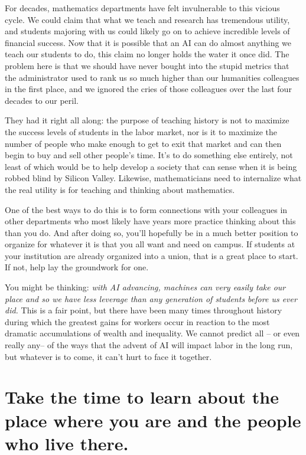 \documentclass[11pt,reqno]{amsart}
\theoremstyle{plain}
\theoremstyle{definition}
\numberwithin{equation}{section}
\numberwithin{theorem}{section}
\begin{document}
For decades, mathematics departments have felt invulnerable to this vicious cycle. We could claim that what we teach and research has tremendous utility, and students majoring with us could likely go on to achieve incredible levels of financial success. Now that it is possible that an AI can do almost anything we teach our students to do, this claim no longer holds the water it once did. The problem here is that we should have never bought into the stupid metrics that the administrator used to rank us so much higher than our humanities colleagues in the first place, and we ignored the cries of those colleagues over the last four decades to our peril. 

They had it right all along: the purpose of teaching history is not to maximize the success levels of students in the labor market, nor is it to maximize the number of people who make enough to get to exit that market and can then begin to buy and sell other people’s time. It’s to do something else entirely, not least of which would be to help develop a society that can sense when it is being robbed blind by Silicon Valley. Likewise, mathematicians need to internalize what the real utility is for teaching and thinking about mathematics. 

One of the best ways to do this is to form connections with your colleagues in other departments who most likely have years more practice thinking about this than you do. And after doing so, you’ll hopefully be in a much better position to organize for whatever it is that you all want and need on campus. If students at your institution are already organized into a union, that is a great place to start. If not, help lay the groundwork for one.


You might be thinking: \textit{with AI advancing, machines can very easily take our place and so we have less leverage than any generation of students before us ever did.} This is a fair point, but there have been many times throughout history during which the greatest gains for workers occur in reaction to the most dramatic accumulations of wealth and inequality. We cannot predict all – or even really any– of the ways that the advent of AI will impact labor in the long run, but whatever is to come, it can’t hurt to face it together. 

\section{Take the time to learn about the place where you are and the people who live there. 
}
\end{document}
